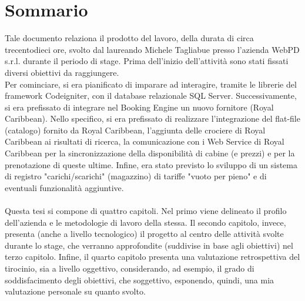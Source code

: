 
\cleardoublepage
{}
{}
\begingroup
\let\clearpage\relax
\let\cleardoublepage\relax
\let\cleardoublepage\relax

\chapter*{Sommario}

Tale documento relaziona il prodotto del lavoro, della durata di circa trecentodieci ore, svolto dal laureando Michele Tagliabue presso l'azienda WebPD s.r.l. durante il periodo di stage. Prima dell'inizio dell'attività sono stati fissati diversi obiettivi da raggiungere.\\
Per cominciare, si era pianificato di imparare ad interagire, tramite le librerie del framework Codeigniter, con il database relazionale SQL Server. 
Successivamente, si era prefissato di integrare nel Booking Engine un nuovo fornitore (Royal Caribbean). Nello specifico, si era prefissato di realizzare l'integrazione del flat-file (catalogo) fornito da Royal Caribbean, l'aggiunta delle crociere di Royal Caribbean ai risultati di ricerca, la comunicazione con i Web Service di Royal Caribbean per la sincronizzazione della disponibilità di cabine (e prezzi) e per la prenotazione di queste ultime.
Infine, era stato previsto lo sviluppo di un sistema di registro "carichi/scarichi" (magazzino) di tariffe "vuoto per pieno" e di eventuali funzionalità aggiuntive.\\ \\
Questa tesi si compone di quattro capitoli. Nel primo viene delineato il profilo dell'azienda e le metodologie di lavoro della stessa. Il secondo capitolo, invece, presenta (anche a livello tecnologico) il progetto al centro delle attività svolte durante lo stage, che verranno approfondite (suddivise in base agli obiettivi) nel terzo capitolo. Infine, il quarto capitolo presenta una valutazione retrospettiva del tirocinio, sia a livello oggettivo, considerando, ad esempio, il grado di soddisfacimento degli obiettivi, che soggettivo, esponendo, quindi, una mia valutazione personale su quanto svolto.

%
%

\endgroup			

\vfill

